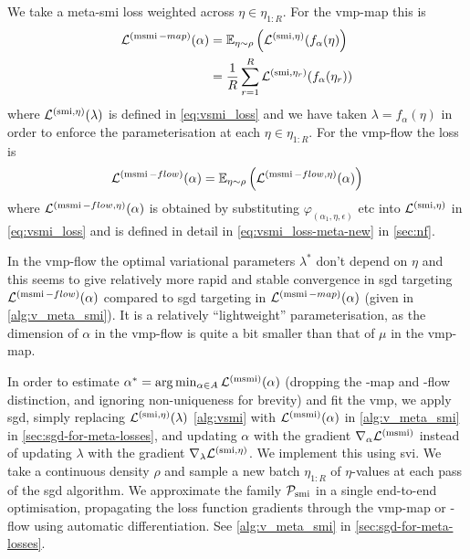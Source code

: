 We take a meta-\acrshort*{smi} loss weighted across $\eta\in \eta_{1:R}$. For the \acrshort*{vmp}-map this is
\begin{align}
  \mathcal{L}^{(\operatorname{\text{msmi}}-map)}(\alpha) & =\operatorname{\mathbb{E}}_{\eta\sim\rho}\left(\mathcal{L}^{(\operatorname{\text{smi}},\eta)}(f_{\alpha}(\eta)\right)\nonumber                       \\
                                & =\frac{1}{R}\sum_{r=1}^R \mathcal{L}^{(\operatorname{\text{smi}},\eta_r)}(f_{\alpha}(\eta_r)) \label{eq:meta_smi_target_loss}
\end{align}
where $\mathcal{L}^{(\operatorname{\text{smi}},\eta)}(\lambda)$ is defined in \cref{eq:vsmi_loss} and we have taken $\lambda=f_{\alpha}(\eta)$ in order to enforce the parameterisation at each $\eta\in \eta_{1:R}$. For the \acrshort*{vmp}-flow the loss is
\begin{align}\label{eq:vsmi_loss-meta-new-main}
  \mathcal{L}^{(\operatorname{\text{msmi}}-flow)}(\alpha)  =\operatorname{\mathbb{E}}_{\eta\sim\rho}\left(\mathcal{L}^{(\operatorname{\text{msmi}}-flow,\eta)}(\alpha)\right) 
\end{align}
where $\mathcal{L}^{(\operatorname{\text{msmi}}-flow,\eta)}(\alpha)$ is obtained by substituting $\varphi_{(\alpha_1,\eta,\epsilon)}$ etc into $\mathcal{L}^{(\operatorname{\text{smi}},\eta)}$ in \cref{eq:vsmi_loss} and is defined in detail in \cref{eq:vsmi_loss-meta-new} in \cref{sec:nf}.

In the \acrshort*{vmp}-flow the optimal variational parameters $\lambda^*$ don't depend on $\eta$ and this seems to give relatively more rapid and stable convergence in \acrshort*{sgd} targeting $\mathcal{L}^{(\operatorname{\text{msmi}}-flow)}(\alpha)$ compared to \acrshort*{sgd} targeting in $\mathcal{L}^{(\operatorname{\text{msmi}}-map)}(\alpha)$ (given in \cref{alg:v_meta_smi}). It is a relatively ``lightweight'' parameterisation, as the dimension of $\alpha$ in the \acrshort*{vmp}-flow is quite a bit smaller than that of $\mu$ in the \acrshort*{vmp}-map.

In order to estimate $\alpha^*=\arg\min_{\alpha\in A} \mathcal{L}^{(\operatorname{\text{msmi}})}(\alpha)$ (dropping the -map and -flow distinction, and ignoring non-uniqueness for brevity) and fit the \acrshort*{vmp}, we apply \acrshort*{sgd}, simply replacing $\mathcal{L}^{(\operatorname{\text{smi}},\eta)}(\lambda)$ \cref{alg:vsmi} with $\mathcal{L}^{(\operatorname{\text{msmi}})}(\alpha)$ in \cref{alg:v_meta_smi} in \cref{sec:sgd-for-meta-losses}, and updating $\alpha$ with the gradient $\nabla_\alpha \mathcal{L}^{(\operatorname{\text{msmi}})}$ instead of updating $\lambda$ with the gradient $\nabla_{\lambda} \mathcal{L}^{(\operatorname{\text{smi}},\eta)}$. We implement this using \acrfull*{svi}. We take a continuous density $\rho$ and sample a new batch $\eta_{1:R}$ of $\eta$-values at each pass of the \acrshort*{sgd} algorithm. We approximate the family  $\mathcal{P}_{\operatorname{\text{smi}}}$ in a single end-to-end optimisation, propagating the loss function gradients through the \acrshort*{vmp}-map or -flow using automatic differentiation. See \cref{alg:v_meta_smi} in \cref{sec:sgd-for-meta-losses}.

